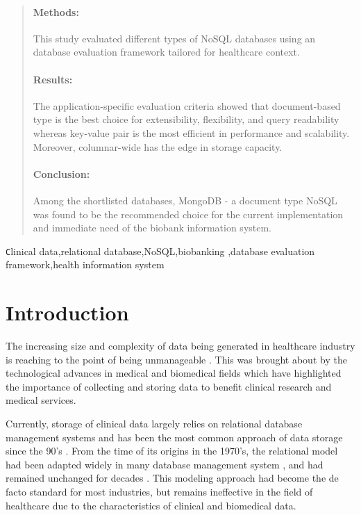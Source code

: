 \documentclass[5p]{elsarticle}
\begin{document}
\begin{frontmatter}
\begin{abstract}
\paragraph{Methods:} This study evaluated different types of NoSQL databases using an database evaluation framework tailored for healthcare context.

\paragraph{Results:} The application-specific evaluation criteria showed that document-based type is the best choice for extensibility, flexibility, and query 
readability whereas key-value pair is the most efficient in performance and scalability. Moreover, columnar-wide has the edge in 
storage capacity. 

\paragraph{Conclusion:} Among the shortlisted databases, MongoDB - a document type NoSQL was found to be the recommended choice for the current implementation 
and immediate need of the biobank information system.

\end{abstract}

\begin{keyword}
\texttt Clinical data\sep relational database\sep NoSQL\sep biobanking
\sep database evaluation framework\sep health information system
\end{keyword}

\end{frontmatter}

\linenumbers

\section{Introduction}
The increasing size and complexity of data being generated in healthcare industry is reaching
 to the point of being unmanageable \cite{R.Kumar2015208,M.Ercan190510}. This was brought about 
 by the technological advances in medical and biomedical fields which have highlighted the importance 
 of collecting and storing data to benefit clinical research and medical services.

Currently, storage of clinical data largely relies on relational database management systems 
\cite{Z.Goli-Malekabadi201675,K.Lee201299} and has been the most common approach of data 
storage since the 90’s \cite{P.Atzeni1993}. From the time of its origins in the 1970’s, the relational 
model had been adapted widely in many database management system \cite{K.Berg201329,D.Suciu200139}, and 
had remained unchanged for decades \cite{M.Ercan190510}. This modeling approach had become the de 
facto standard for most industries, but remains ineffective in the field of healthcare due to the characteristics
 of clinical and biomedical data.
\end{document}
